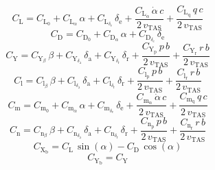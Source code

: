 \documentclass[lettersize,journal]{IEEEtran}
\begin{document}
{\begin{equation}
C_{\mathrm{L}}=C_{\mathrm{L}_{\mathrm{0}}}+C_{\mathrm{L}_{\alpha} }\,\alpha +C_{\mathrm{L}_{\delta_{\mathrm{e}}}}\,\delta _{\mathrm{e}}+\frac{C_{\mathrm{L}_{\dot{\alpha }}}\,\dot{\alpha }\,c}{2\,v_{\mathrm{TAS}}}+\frac{C_{\mathrm{L}_{\mathrm{q}}}\,q\,c}{2\,v_{\mathrm{TAS}}}
\end{equation}
\begin{equation}
C_{\mathrm{D}}=C_{\mathrm{D}_{\mathrm{0}}}+C_{\mathrm{D}_{\alpha}}\,\alpha + C_{\mathrm{D}_{\delta_{\mathrm{e}}}}\,\delta _{\mathrm{e}}
\end{equation}
\begin{equation}
C_{\mathrm{Y}}=C_{\mathrm{Y}_{\beta}}\,\beta +C_{\mathrm{Y}_{\delta_{\mathrm{a}}}}\,\delta _{\mathrm{a}}+C_{\mathrm{Y}_{\delta_{\mathrm{r}}}}\,\delta _{\mathrm{r}}+\frac{C_{\mathrm{Y}_{\mathrm{p}}}\,p\,b}{2\,v_{\mathrm{TAS}}}+\frac{C_{\mathrm{Y}_{\mathrm{r}}}\,r\,b}{2\,v_{\mathrm{TAS}}}
\end{equation}
\begin{equation}
C_{\mathrm{l}}=C_{\mathrm{l}_{\beta}}\,\beta +C_{\mathrm{l}_{\delta_{\mathrm{a}}}}\,\delta _{\mathrm{a}}+C_{\mathrm{l}_{\delta_{\mathrm{r}}}}\,\delta _{\mathrm{r}}+\frac{C_{\mathrm{l}_{\mathrm{p}}}\,p\,b}{2\,v_{\mathrm{TAS}}}+\frac{C_{\mathrm{l}_{\mathrm{r}}}\,r\,b}{2\,v_{\mathrm{TAS}}}
\end{equation}
\begin{equation}
C_{\mathrm{m}}=C_{\mathrm{m}_{0}}+C_{\mathrm{m}_{\alpha}}\,\alpha +C_{\mathrm{m}_{\delta_{\mathrm{e}}}}\,\delta _{\mathrm{e}}+\frac{C_{\mathrm{m}_{\dot{\alpha}}}\,\dot{\alpha }\,c}{2\,v_{\mathrm{TAS}}}+\frac{C_{\mathrm{m}_{\mathrm{q}}}\,q\,c}{2\,v_{\mathrm{TAS}}}
\end{equation}
\begin{equation}
C_{\mathrm{n}}=C_{\mathrm{n}_{\beta}}\,\beta +C_{\mathrm{n}_{\delta_{\mathrm{a}}}}\,\delta _{\mathrm{a}}+C_{\mathrm{n}_{\delta_{\mathrm{r}}}}\,\delta _{\mathrm{r}}+\frac{C_{\mathrm{n}_{\mathrm{p}}}\,p\,b}{2\,v_{\mathrm{TAS}}}+\frac{C_{\mathrm{n}_{\mathrm{r}}}\,r\,b}{2\,v_{\mathrm{TAS}}}
\end{equation}
\begin{equation}
C_{\mathrm{X}_{\mathrm{b}}}=C_{\mathrm{L}}\,\sin\left(\alpha \right)-C_{\mathrm{D}}\,\cos\left(\alpha \right)
\end{equation}
\begin{equation}
C_{\mathrm{Y}_{\mathrm{b}}}=C_{\mathrm{Y}}
\end{equation}
\begin{equation}

\end{equation}}
\end{document}
